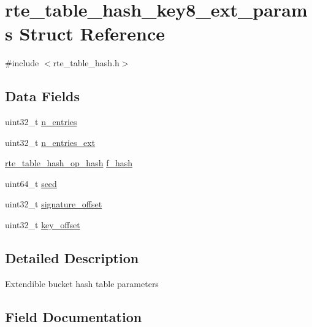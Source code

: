 \hypertarget{structrte__table__hash__key8__ext__params}{}\section{rte\+\_\+table\+\_\+hash\+\_\+key8\+\_\+ext\+\_\+params Struct Reference}
\label{structrte__table__hash__key8__ext__params}


{\ttfamily \#include $<$rte\+\_\+table\+\_\+hash.\+h$>$}

\subsection*{Data Fields}
\begin{DoxyCompactItemize}
\item 
uint32\+\_\+t \hyperlink{structrte__table__hash__key8__ext__params_aafba5a1f8ad65b41148894026098cad7}{n\+\_\+entries}
\item 
uint32\+\_\+t \hyperlink{structrte__table__hash__key8__ext__params_a27661399b844b87af80fbeb4052ae2cb}{n\+\_\+entries\+\_\+ext}
\item 
\hyperlink{rte__table__hash_8h_a6633f20f58e850abc3d1650af5d900da}{rte\+\_\+table\+\_\+hash\+\_\+op\+\_\+hash} \hyperlink{structrte__table__hash__key8__ext__params_a5a7373267cebe4384507b331c883624a}{f\+\_\+hash}
\item 
uint64\+\_\+t \hyperlink{structrte__table__hash__key8__ext__params_a13dfa5fcb8e1184f1f7756e717fd2807}{seed}
\item 
uint32\+\_\+t \hyperlink{structrte__table__hash__key8__ext__params_a255e199334632db5019afe0eb166a05a}{signature\+\_\+offset}
\item 
uint32\+\_\+t \hyperlink{structrte__table__hash__key8__ext__params_aa09132fc271bc1be2e4032587665bcf7}{key\+\_\+offset}
\end{DoxyCompactItemize}


\subsection{Detailed Description}
Extendible bucket hash table parameters 

\subsection{Field Documentation}
\hypertarget{structrte__table__hash__key8__ext__params_a5a7373267cebe4384507b331c883624a}{}
